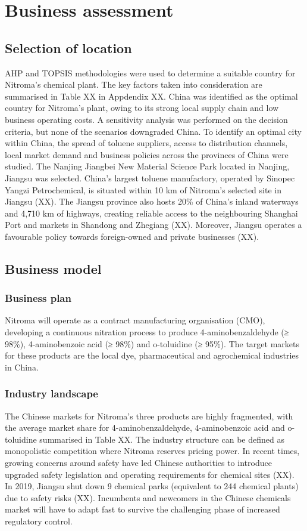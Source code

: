 \section{Business assessment}
\label{sec:economics}
\subsection{Selection of location} 
AHP and TOPSIS methodologies were used to determine a suitable country for Nitroma’s chemical plant. The key factors taken into consideration are summarised in Table XX in Appdendix XX. China was identified as the optimal country for Nitroma's plant, owing to its strong local supply chain and low business operating costs. A sensitivity analysis was performed on the decision criteria, but none of the scenarios downgraded China. To identify an optimal city within China, the spread of toluene suppliers, access to distribution channels, local market demand and business policies across the provinces of China were studied. The Nanjing Jiangbei New Material Science Park located in Nanjing, Jiangsu was selected. China’s largest toluene manufactory, operated by Sinopec Yangzi Petrochemical, is situated within 10 km of Nitroma’s selected site in Jiangsu (XX). The Jiangsu province also hosts 20\% of China’s inland waterways and 4,710 km of highways, creating reliable access to the neighbouring Shanghai Port and markets in Shandong and Zhegiang (XX). Moreover, Jiangsu operates a favourable policy towards foreign-owned and private businesses (XX). 

\subsection{Business model} 
\subsubsection{Business plan}
Nitroma will operate as a contract manufacturing organisation (CMO), developing a continuous nitration process to produce 4-aminobenzaldehyde (≥ 98\%), 4-aminobenzoic acid (≥ 98\%) and o-toluidine (≥ 95\%). The target markets for these products are the local dye, pharmaceutical and agrochemical industries in China.
\subsubsection{Industry landscape}
The Chinese markets for Nitroma’s three products are highly fragmented, with the average market share for 4-aminobenzaldehyde, 4-aminobenzoic acid and o-toluidine summarised in Table XX. The industry structure can be defined as monopolistic competition where Nitroma reserves pricing power. In recent times, growing concerns around safety have led Chinese authorities to introduce upgraded safety legislation and operating requirements for chemical sites (XX). In 2019, Jiangsu shut down 9 chemical parks (equivalent to 244 chemical plants) due to safety risks (XX). Incumbents and newcomers in the Chinese chemicals market will have to adapt fast to survive the challenging phase of increased regulatory control. 
